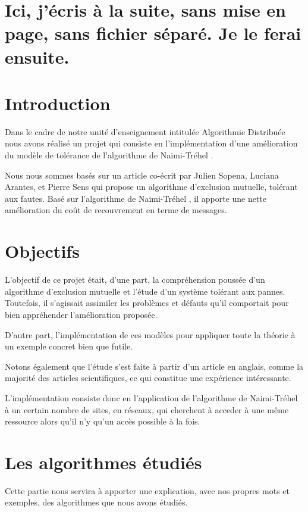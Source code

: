 \documentclass[a4paper,12pt]{article}
\title{\psubject}
\author{Raimana BOUISSOU, Tom GIMENEZ, Léo RIZZON}
\date{}
\newcommand{\nt}{Naimi-Tréhel }
\begin{document}
\maketitle

\section*{Ici, j'écris à la suite, sans mise en page, sans fichier séparé. Je le ferai ensuite.}

\section{Introduction}

Dans le cadre de notre unité d'enseignement intitulée Algorithmie Distribuée nous avons réalisé un projet qui consiste en l'implémentation d'une amélioration du modèle de tolérance de l'algorithme de \nt.

Nous nous sommes basés sur un article co-écrit par Julien Sopena, Luciana Arantes, et Pierre Sens qui propose un algorithme d'exclusion mutuelle, tolérant aux fautes. Basé sur l'algorithme de \nt, il apporte une nette amélioration du coût de recouvrement en terme de messages.



\section{Objectifs}

L'objectif de ce projet était, d'une part, la compréhension poussée d'un algorithme d'exclusion mutuelle et l'étude d'un système tolérant aux pannes.  Toutefois, il s'agissait assimiler les problèmes et défauts qu'il comportait pour bien appréhender l'amélioration proposée.

D'autre part, l'implémentation de ces modèles pour appliquer toute la théorie à un exemple concret bien que futile.

Notons également que l'étude s'est faite à partir d'un article en anglais, comme la majorité des articles scientifiques, ce qui constitue une expérience intéressante.

L'implémentation consiste donc en l'application de l'algorithme de \nt à un certain nombre de sites, en réseaux, qui cherchent à acceder à une même ressource alors qu'il n'y qu'un accès possible à la fois.

\newpage

\section{Les algorithmes étudiés}
Cette partie nous servira à apporter une explication, avec nos propres mots et exemples, des algorithmes que nous avons étudiés.
\end{document}

